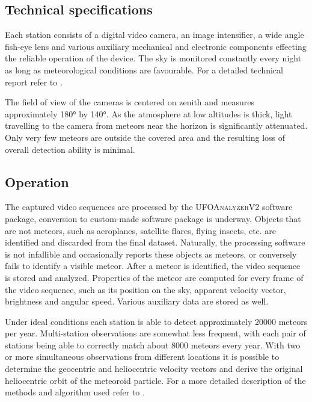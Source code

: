         \subsection{Technical specifications} \label{ilat}
            Each station consists of a digital video camera, an image intensifier, a wide angle fish-eye lens
            and various auxiliary mechanical and electronic components effecting
            the reliable operation of the device. The sky is monitored constantly every night
            as long as meteorological conditions are favourable. For a detailed technical report refer to \citet{zigo+2013,toth+2015}.

            The field of view of the cameras is centered on zenith and measures approximately \ang{180} by \ang{140}.
            As the atmosphere at low altitudes is thick, light travelling to the camera from
            meteors near the horizon is significantly attenuated.
            Only very few meteors are outside the covered area and the resulting loss of overall detection ability is minimal.

        \subsection{Operation} \label{ilao}
            The captured video sequences are processed by the \textsc{UFOAnalyzerV2} software package,
            conversion to custom-made software package is underway.
            Objects that are not meteors, such as aeroplanes, satellite flares, flying insects, etc.
            are identified and discarded from the final dataset. Naturally, the processing software is not
            infallible and occasionally reports these objects as meteors, or conversely fails to identify a visible meteor.
            After a meteor is identified, the video sequence is stored and analyzed.
            Properties of the meteor are computed for every frame of the video sequence,
            such as its position on the sky, apparent velocity vector, brightness and angular speed.
            Various auxiliary data are stored as well.

            Under ideal conditions each station is able to detect approximately 20000 meteors per year.
            Multi-station observations are somewhat less frequent, with each pair of stations being able
            to correctly match about 8000 meteors every year.
            With two or more simultaneous observations from different locations it is possible to determine
            the geocentric and heliocentric velocity vectors and derive the original heliocentric orbit of the meteoroid particle.
            For a more detailed description of the methods and algorithm used refer to \citet{fero?}.

